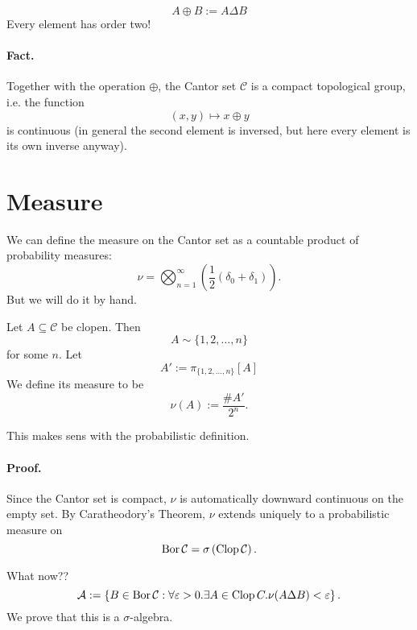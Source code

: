 \[ 
    A \oplus B := A \Delta B 
\]
Every element has order two!

\paragraph{Fact.} Together with the operation \( \oplus \), the Cantor set \( \mathcal{C} \) is a compact topological group, i.e. the function
\[ 
    (x, y) \mapsto x \oplus y 
\]
is continuous (in general the second element is inversed, but here every element is its own inverse anyway). 

\section{Measure}

We can define the measure on the Cantor set as a countable product of probability measures:
\[ 
    \nu = \bigotimes_{n=1}^\infty ( \frac{1}{2} (\delta_0 + \delta_1) ).
\]
But we will do it by hand.
\begin{defn}
Let \( A \subseteq \mathcal{C} \) be clopen. Then
\[ 
    A \sim \{1, 2, \ldots, n\} 
\]
for some \( n \). Let
\[ 
    A' := \pi_{\{1, 2, \ldots, n\} }[A]
\]We define its measure to be
\[ 
    \nu (A) := \frac{\# A'}{2^n}.
\]
\end{defn}
This makes sens with the probabilistic definition.


\paragraph{Proof.} Since the Cantor set is compact, \( \nu \) is automatically downward continuous on the empty set. By Caratheodory's Theorem, \( \nu \) extends uniquely to a probabilistic measure on 
\[ 
    \operatorname{Bor} \mathcal{C} = \sigma \left( \operatorname{Clop} \mathcal{C} \right).
\]

What now??
\[ 
    \mathcal{A} := \left\{ B \in \operatorname{Bor} \mathcal{C} : \forall\varepsilon > 0. \exists A \in \operatorname{Clop} C. \nu (A \Delta B) <\varepsilon \right\}.
\]
We prove that this is a \( \sigma \)-algebra.

